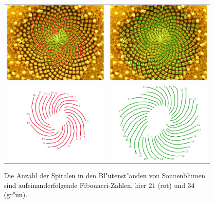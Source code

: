 \begin{figure}
\begin{center}
\begin{tabular}{cc}
\includegraphics[width=0.47\hsize]{graphics/helianthus-fibonacci2.jpg}&%
\includegraphics[width=0.47\hsize]{graphics/helianthus-fibonacci3.jpg}\\%
\includegraphics[width=0.47\hsize]{graphics/helianthus-fibonacci5.jpg}&%
\includegraphics[width=0.47\hsize]{graphics/helianthus-fibonacci4.jpg}
\end{tabular}
\end{center}
\caption{Die Anzahl der Spiralen in den Bl"utenst"anden von Sonnenblumen
sind aufeinanderfolgende Fibonacci-Zahlen, hier $21$ (rot) und $34$ (gr"un).
\label{helianthus}}
\end{figure}

